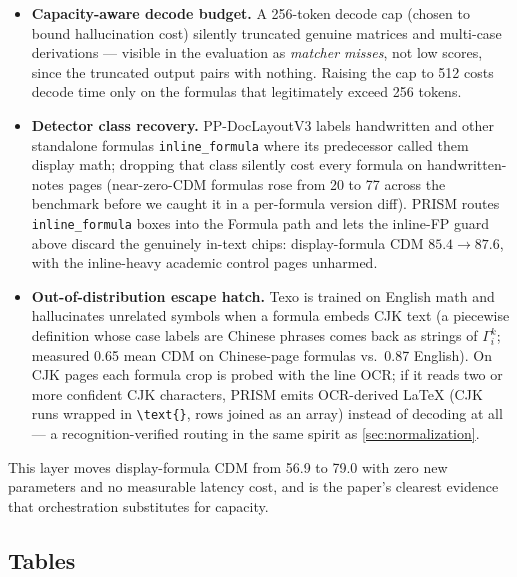 \begin{itemize}
\item \textbf{Capacity-aware decode budget.} A 256-token decode cap (chosen to bound hallucination cost) silently truncated genuine matrices and multi-case derivations --- visible in the evaluation as \emph{matcher misses}, not low scores, since the truncated output pairs with nothing. Raising the cap to 512 costs decode time only on the formulas that legitimately exceed 256 tokens.
\item \textbf{Detector class recovery.} PP-DocLayoutV3 labels handwritten and other standalone formulas \texttt{inline\_formula} where its predecessor called them display math; dropping that class silently cost every formula on handwritten-notes pages (near-zero-CDM formulas rose from 20 to 77 across the benchmark before we caught it in a per-formula version diff). PRISM routes \texttt{inline\_formula} boxes into the Formula path and lets the inline-FP guard above discard the genuinely in-text chips: display-formula CDM $85.4 \rightarrow 87.6$, with the inline-heavy academic control pages unharmed.
\item \textbf{Out-of-distribution escape hatch.} Texo is trained on English math and hallucinates unrelated symbols when a formula embeds CJK text (a piecewise definition whose case labels are Chinese phrases comes back as strings of $\Gamma_i^k$; measured 0.65 mean CDM on Chinese-page formulas vs.\ 0.87 English). On CJK pages each formula crop is probed with the line OCR; if it reads two or more confident CJK characters, PRISM emits OCR-derived \LaTeX{} (CJK runs wrapped in \verb|\text{}|, rows joined as an array) instead of decoding at all --- a recognition-verified routing in the same spirit as \cref{sec:normalization}.
\end{itemize}

This layer moves display-formula CDM from 56.9 to 79.0 with zero new parameters and no measurable latency cost, and is the paper's clearest evidence that orchestration substitutes for capacity.

\subsection{Tables}
\label{sec:tables}

